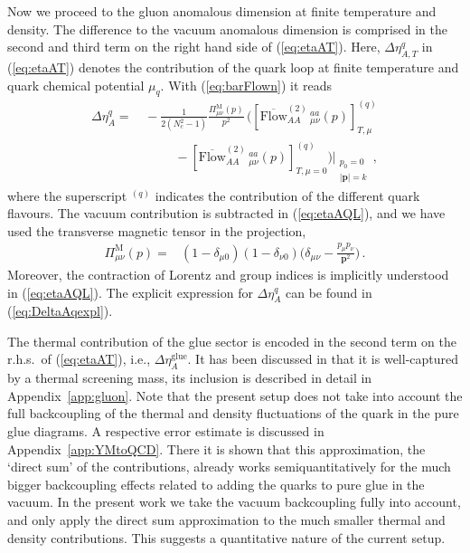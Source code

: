 \documentclass[%
reprint,
superscriptaddress,
showpacs,preprintnumbers,
 amsmath,amssymb,
 aps,
prd,
]{revtex4-1}
\def\eq#1{(\ref{#1})}
\def\app#1{Appendix~\ref{#1}}
\begin{document}
Now we proceed to the gluon anomalous dimension at finite temperature
and density. The difference to the vacuum anomalous dimension is
comprised in the second and third term on the right hand side of
\eq{eq:etaAT}.  Here, $\Delta\eta_{A,T}^{q}$ in \eq{eq:etaAT} denotes
the contribution of the quark loop at finite temperature and quark
chemical potential $\mu_q$. With \eq{eq:barFlown} it reads
%
\begin{align}
  \Delta\eta_{A}^{q}=
  &\, -\frac{1}{2 (N_c^2-1)}
    \frac{\Pi_{\mu\nu}^{\text{M}}(p)}{p^2}
    \,\Bigg(\left[\overline{{
    \textrm{Flow}}}^{(2)}_{AA}{\,}^{aa}_{\mu\nu}(p)\right]^{(q)}_{T,\mu} 
    \nonumber \\[1ex]
  &\,\hspace{1cm}-\left[\overline{{
    \textrm{Flow}}}^{(2)}_{AA}{\,}^{aa}_{\mu\nu}(p)\right]^{(q)}_{T,\mu=0} 
    \Bigg)\Bigg|_{\substack{p_0=0\\|\bm{p}|=k}}\,,\label{eq:etaAQL}
\end{align}
%
where the superscript $^{(q)}$ indicates the contribution of the
different quark flavours.  The vacuum contribution is subtracted in
\eq{eq:etaAQL}, and we have used the transverse magnetic tensor in the
projection,
%
\begin{align}
  \Pi_{\mu\nu}^{\text{M}}(p)=
  &(1-\delta_{\mu 0})(1-\delta_{\nu 0})
    \Big(\delta_{\mu\nu}-\frac{p_{\mu}p_{\nu}}{
    \bm{p}^2}\Big)\,.\label{eq:magproj}
\end{align}
%
Moreover, the contraction of Lorentz and group indices is implicitly
understood in \eq{eq:etaAQL}. The explicit expression for
$\Delta\eta_{A}^{q}$ can be found in \eq{eq:DeltaAqexpl}.

The thermal contribution of the glue sector is encoded in the second
term on the r.h.s.\ of \eq{eq:etaAT}, i.e.,
$\Delta\eta_{A}^{\text{glue}}$. It has been discussed in
\cite{Cyrol:2017qkl} that it is well-captured by a thermal screening
mass, its inclusion is described in detail in \app{app:gluon}. Note
that the present setup does not take into account the full
backcoupling of the thermal and density fluctuations of the quark in
the pure glue diagrams. A respective error estimate is discussed in
\app{app:YMtoQCD}. There it is shown that this approximation, the
`direct sum' of the contributions, already works semiquantitatively
for the much bigger backcoupling effects related to adding the quarks
to pure glue in the vacuum. In the present work we take the vacuum
backcoupling fully into account, and only apply the direct sum
approximation to the much smaller thermal and density
contributions. This suggests a quantitative nature of the current
setup.
\end{document}
